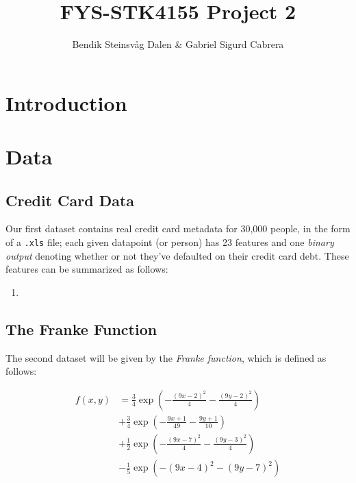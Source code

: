 \documentclass[a4paper,10pt,english]{article}
\begin{document}
\title{FYS-STK4155 Project 2}
\author{Bendik Steinsvåg Dalen \& Gabriel Sigurd Cabrera}

\maketitle
\begin{abstract}
\end{abstract}

\begin{multicols*}{2}

\section*{Introduction}
\label{sec:introduction}

\section*{Data}
\label{sec:data}

\subsection*{Credit Card Data}

Our first dataset contains real credit card metadata for 30,000 people, in the form of a \texttt{.xls} file; each given datapoint (or person) has 23 features and one \textit{binary output} denoting whether or not they've defaulted on their credit card debt.  These features can be summarized as follows:

\begin{enumerate}
\item 
\end{enumerate}

\subsection*{The Franke Function}

The second dataset will be given by the \textit{Franke function}, which is defined as follows:

\begin{align*}
f(x,y) &= \frac{3}{4} \exp \left( -\frac{(9x-2)^2}{4} -\frac{(9y-2)^2}{4} \right) \\ &+ \frac{3}{4} \exp \left( -\frac{9x+1}{49} -\frac{9y+1}{10} \right) \\ &+ \frac{1}{2} \exp \left( -\frac{(9x-7)^2}{4} -\frac{(9y-3)^2}{4} \right) \\ &- \frac{1}{5} \exp \left( -(9x-4)^2 - (9y-7)^2 \right)
\end{align*}


\end{multicols*}
\end{document}
